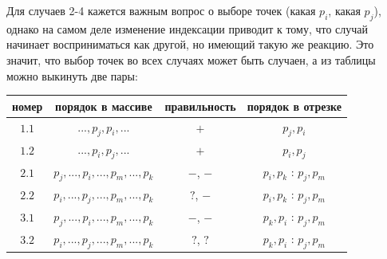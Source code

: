 \documentclass[letterpaper,12pt]{article}
\begin{document}
Для случаев 2-4 кажется важным вопрос о выборе точек (какая $p_i$,
какая $p_j$), однако на самом деле изменение индексации приводит к
тому, что случай начинает восприниматься как другой, но имеющий
такую же реакцию. Это значит, что выбор точек во всех случаях может
быть случаен, а из таблицы можно выкинуть две пары:

\begin{center}
      \begin{tabular}{| c | c | c | c |}
            \hline
            номер & порядок в массиве & 
            правильность & порядок в отрезке \\
            \hline
            $1.1$ &
            $..., p_j, p_i, ...$ & $+$ & $p_j, p_i$ \\
            \hline
            $1.2$ &
            $..., p_i, p_j, ...$ & $+$ & $p_i, p_j$ \\
            \hline
            $2.1$ &
            $p_j, ..., p_i, ..., p_m, ..., p_k$ & 
            $-$, $-$ & $p_i, p_k$ : $p_j, p_m$ \\
            \hline
            $2.2$ &
            $p_i, ..., p_j, ..., p_m, ..., p_k$ & 
            $?$, $-$ & $p_i, p_k$ : $p_j, p_m$ \\
            \hline
            $3.1$ &
            $p_j, ..., p_i, ..., p_m, ..., p_k$ & 
            $-$, $-$ & $p_k, p_i$ : $p_j, p_m$ \\
            \hline
            $3.2$ &
            $p_i, ..., p_j, ..., p_m, ..., p_k$ & 
            $?$, $?$ & $p_k, p_i$ : $p_j, p_m$ \\
            \hline 
      \end{tabular}
\end{center}
\end{document}
